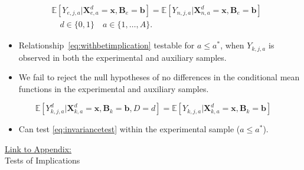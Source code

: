 \documentclass[static]{JJH-Beamer}
\begin{document}
\begin{frame}

\begin{align}\label{eq:withbetimplication}
&\mathbb{E} \left[ Y_{e,j,a} | \bm{X}^d_{e,a} = \bm{x}, \bm{B}_e = \bm{b} \right] = \mathbb{E} \left[ Y_{n,j,a} | \bm{X}^d_{n,a} = \bm{x}, \bm{B}_e = \bm{b} \right]\\
& \quad d \in \{0,1\} \quad  a \in \{1,\dots,A\}. \nonumber
\end{align}

\begin{itemize}
\item Relationship~\eqref{eq:withbetimplication} testable for $a \leq  a^*$, when $Y_{k,j,a}$ is observed in both the experimental and auxiliary samples.
\item We fail to reject the null hypotheses of no differences in the conditional mean functions in the experimental and auxiliary samples.
\end{itemize}

\end{frame}

\begin{frame}

\begin{equation}\label{eq:invariancetest}
\mathbb{E} \left[ Y_{k,j,a}^d | \bm{X}_{k,a}^d  = \bm{x}, \bm{B}_k = \bm{b}, D = d \right] = \mathbb{E} \left[ Y_{k,j,a} | \bm{X}^d_{k,a}  = \bm{x}, \bm{B}_k = \bm{b} \right]
\end{equation}

\begin{itemize}
\item Can test \eqref{eq:invariancetest} within the experimental sample ($a \leq a^*$).
\end{itemize}

\end{frame}

\begin{frame}

\hypertarget{ret:creamcheese}{}
\begin{center}
\hyperlink{creamcheese}{\underline{Link to Appendix:}}\\
\vspace{1.5mm}
Tests of Implications
\end{center}

\end{frame}
\end{document}
